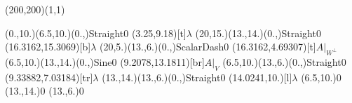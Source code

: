 \unitlength=1bp%

\begin{feynartspicture}(200,200)(1,1)

\FADiagram{}
\FAProp(0.,10.)(6.5,10.)(0.,){Straight}{0}
\FALabel(3.25,9.18)[t]{$\lambda$}
\FAProp(20,15.)(13.,14.)(0.,){Straight}{0}
\FALabel(16.3162,15.3069)[b]{$\lambda$}
\FAProp(20,5.)(13.,6.)(0.,){ScalarDash}{0}
\FALabel(16.3162,4.69307)[t]{$A|_{W^\perp}$}
\FAProp(6.5,10.)(13.,14.)(0.,){Sine}{0}
\FALabel(9.2078,13.1811)[br]{$A|_V$}
\FAProp(6.5,10.)(13.,6.)(0.,){Straight}{0}
\FALabel(9.33882,7.03184)[tr]{$\lambda$}
\FAProp(13.,14.)(13.,6.)(0.,){Straight}{0}
\FALabel(14.0241,10.)[l]{$\lambda$}
\FAVert(6.5,10.){0}
\FAVert(13.,14.){0}
\FAVert(13.,6.){0}
\end{feynartspicture}

